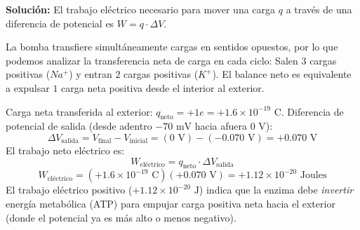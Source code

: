\documentclass[11pt,letterpaper]{article}
\begin{document}
\begin{enumerate}[leftmargin=*]
    \textbf{Solución:}
    El trabajo eléctrico necesario para mover una carga $q$ a través de una diferencia de potencial es $W = q \cdot \Delta V$.
    
    La bomba transfiere simultáneamente cargas en sentidos opuestos, por lo que podemos analizar la transferencia neta de carga en cada ciclo:
    Salen $3$ cargas positivas ($Na^+$) y entran $2$ cargas positivas ($K^+$). El balance neto es equivalente a expulsar $1$ carga neta positiva desde el interior al exterior.
    
    Carga neta transferida al exterior: $q_{\text{neto}} = +1e = +1.6 \times 10^{-19} \text{ C}$.
    Diferencia de potencial de salida (desde adentro $-70 \text{ mV}$ hacia afuera $0 \text{ V}$):
    \[
    \Delta V_{\text{salida}} = V_{\text{final}} - V_{\text{inicial}} = (0 \text{ V}) - (-0.070 \text{ V}) = +0.070 \text{ V}
    \]
    El trabajo neto eléctrico es:
    \[
    W_{\text{eléctrico}} = q_{\text{neto}} \cdot \Delta V_{\text{salida}}
    \]
    \[
    W_{\text{eléctrico}} = (+1.6 \times 10^{-19} \text{ C})(+0.070 \text{ V}) = +1.12 \times 10^{-20} \text{ Joules}
    \]
    El trabajo eléctrico positivo ($+1.12 \times 10^{-20} \text{ J}$) indica que la enzima debe \textit{invertir} energía metabólica (ATP) para empujar carga positiva neta hacia el exterior (donde el potencial ya es más alto o menos negativo).

\end{enumerate}
\end{document}
